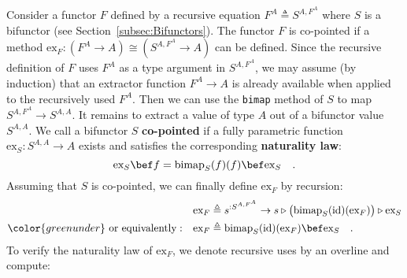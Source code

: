 Consider a functor $F$ defined by a recursive equation $F^{A}\triangleq S^{A,F^{A}}$
where $S$ is a bifunctor (see Section~\ref{subsec:Bifunctors}).
The functor $F$ is co-pointed if a method $\text{ex}_{F}:(F^{A}\rightarrow A)\cong(S^{A,F^{A}}\rightarrow A)$
can be defined. Since the recursive definition of $F$ uses $F^{A}$
as a type argument in $S^{A,F^{A}}$, we may assume (by induction)
that an extractor function $F^{A}\rightarrow A$ is already available
when applied to the recursively used $F^{A}$. Then we can use the
\lstinline!bimap! method of $S$ to map $S^{A,F^{A}}\rightarrow S^{A,A}$.
It remains to extract a value of type $A$ out of a bifunctor value
$S^{A,A}$. We call a bifunctor $S$ \textbf{co-pointed}
if a fully parametric function $\text{ex}_{S}:S^{A,A}\rightarrow A$
exists and satisfies the corresponding \textbf{naturality law}:
\begin{equation}
\text{ex}_{S}\bef f=\text{bimap}_{S}(f)(f)\bef\text{ex}_{S}\quad.\label{eq:copointed-bifunctor-naturality-law}
\end{equation}
Assuming that $S$ is co-pointed, we can finally define $\text{ex}_{F}$
by recursion:
\begin{align*}
 & \text{ex}_{F}\triangleq s^{:S^{A,F^{A}}}\rightarrow s\triangleright\big(\text{bimap}_{S}(\text{id})(\text{ex}_{F})\big)\triangleright\text{ex}_{S}\\
{\color{greenunder}\text{ or equivalently}:}\quad & \text{ex}_{F}\triangleq\text{bimap}_{S}(\text{id})(\text{ex}_{F})\bef\text{ex}_{S}\quad.
\end{align*}
To verify the naturality law of $\text{ex}_{F}$, we denote recursive
uses by an overline and compute:
